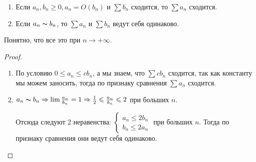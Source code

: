 \begin{follow}
    \begin{enumerate}
        \item Если $a_n, b_n \geqslant 0, a_n = O(b_n)$ и $\sum b_n$ сходится, то $\sum a_n$ сходится. 
        \item Если $a_n \thicksim b_n$, то $\sum a_n$ и $\sum b_n$ ведут себя одинаково.
    \end{enumerate}
    Понятно, что все это при $n \to +\infty$.
\end{follow}
\begin{proof} \quad 

    \begin{enumerate}
        \item По условию $0 \leqslant a_n \leqslant cb_n$, а мы знаем, что $\sum cb_n$ сходится, так как константу мы можем заносить, тогда по признаку сравнения $\sum a_n$ сходится.
        \item $a_n \thicksim b_n \Rightarrow \lim \frac{a_n}{b_n} = 1 \Rightarrow \frac{1}{2} \leqslant \frac{a_n}{b_n} \leqslant 2$ при больших $n$.
    
        Отсюда следуют 2 неравенства: $\begin{cases}
            a_n \leqslant 2b_n \\
            b_n \leqslant 2a_n
        \end{cases}$ при больших $n$. Тогда по признаку сравнения они ведут себя одинаково.
    \end{enumerate}
\end{proof}
